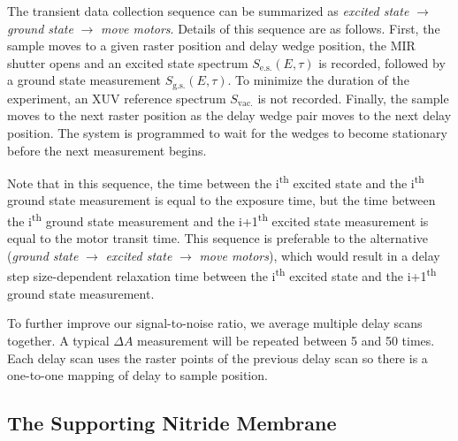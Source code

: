The transient data collection sequence can be summarized as \textit{excited state} $\rightarrow$ \textit{ground state} $\rightarrow$ \textit{move motors}. Details of this sequence are as follows. First, the sample moves to a given raster position and delay wedge position, the MIR shutter opens and an excited state spectrum $S_{\textrm{e.s.}}(E, \tau)$ is recorded, followed by a ground state measurement $S_{\textrm{g.s.}}(E, \tau)$. To minimize the duration of the experiment, an XUV reference spectrum $S_{\textrm{vac.}}$ is not recorded. Finally, the sample moves to the next raster position as the delay wedge pair moves to the next delay position. The system is programmed to wait for the wedges to become stationary before the next measurement begins.

Note that in this sequence, the time between the i\textsuperscript{th} excited state and the i\textsuperscript{th} ground state measurement is equal to the exposure time, but the time between the i\textsuperscript{th} ground state measurement and the i+1\textsuperscript{th} excited state measurement is equal to the motor transit time. This sequence is preferable to the alternative (\textit{ground state} $\rightarrow$ \textit{excited state} $\rightarrow$ \textit{move motors}), which would result in a delay step size-dependent relaxation time between the i\textsuperscript{th} excited state and the i+1\textsuperscript{th} ground state measurement.

To further improve our signal-to-noise ratio, we average multiple delay scans together. A typical $\Delta A$ measurement will be repeated between 5 and 50 times. Each delay scan uses the raster points of the previous delay scan so there is a one-to-one mapping of delay to sample position.

\subsection{The Supporting Nitride Membrane}

